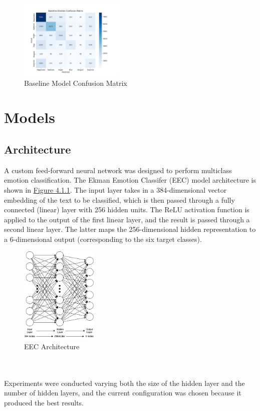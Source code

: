 \documentclass[11pt]{article}
\begin{document}
\renewcommand{\thefigure}{3.2}
\begin{figure}[h]
	\centering
	\includegraphics[width=0.45\textwidth]{baseline_emotion_confusion_matrix_combined.png}
	\caption{Baseline Model Confusion Matrix}
	\label{fig:baseline_confusion_matrix_combined}
\end{figure}

\section{Models}
\subsection{Architecture}
A custom feed-forward neural network was designed to perform multiclass emotion classification. The Ekman Emotion Classifer (EEC) model architecture is shown in \hyperref[fig:eec_architecture]{Figure 4.1.1}. The input layer takes in a 384-dimensional vector embedding of the text to be classified, which is then passed through a fully connected (linear) layer with 256 hidden units. The ReLU activation function is applied to the output of the first linear layer, and the result is passed through a second linear layer. The latter maps the 256-dimensional hidden representation to a 6-dimensional output (corresponding to the six target classes).
\renewcommand{\thefigure}{4.1.1}
\begin{figure}[h]
	\centering
	\includegraphics[width=0.33\textwidth]{eec_architecture.png}
	\caption{EEC Architecture}
	\label{fig:eec_architecture}
\end{figure}
\\ \\ Experiments were conducted varying both the size of the hidden layer and the number of hidden layers, and the current configuration was chosen because it produced the best results.
\end{document}
